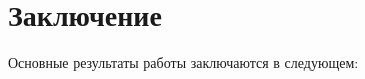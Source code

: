 \chapter*{Заключение}                       %


Основные результаты работы заключаются в следующем:


